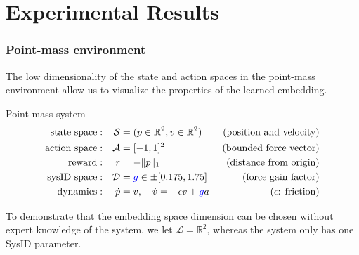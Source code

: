 \documentclass{beamer}
\newcommand{\R}{\mathbb{R}}
\newcommand{\cA}{\mathcal{A}}
\newcommand{\cD}{\mathcal{D}}
\newcommand{\cL}{\mathcal{L}}
\newcommand{\cS}{\mathcal{S}}
\newcommand{\embedfn}{e}
\newcommand{\idfn}{{id}}
\newcommand{\latent}{\cL}
\newcommand{\good}[1]{\textcolor{blue}{#1}}
\begin{document}
\section{Experimental Results}

\begin{frame}
\frametitle{Point-mass environment}
The low dimensionality of the state and action spaces in the point-mass environment
allow us to visualize the properties of the learned embedding.

\begin{block}{Point-mass system}
\vspace{-.4cm}
\begin{align*}
\text{state space}  & : & \cS    &= (p \in \R^2, v \in \R^2) & \text{ (position and velocity)} \\
\text{action space} & : & \cA    &= [-1, 1]^2 & \text{ (bounded force vector)} \\
\text{reward}       & : & r      &= -\|p\|_1 & \text{ (distance from origin)} \\
\text{sysID space}  & : & \cD    &= \good{g} \in \pm[0.175, 1.75] & \text{ (force gain factor)} \\
\text{dynamics}     & : & \dot p &= v, \quad \dot v = -\epsilon v + \good{g}a & \text{($\epsilon$: friction)}
\end{align*}
\end{block}
To demonstrate that the embedding space dimension can be chosen without expert knowledge of the system, we let $\cL = \R^2$, whereas the system only has one SysID parameter.
\end{frame}

\end{document}
